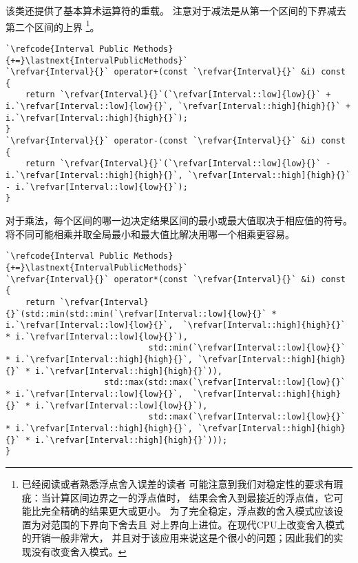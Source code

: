 该类还提供了基本算术运算符的重载。
注意对于减法是从第一个区间的下界减去第二个区间的上界
\footnote{已经阅读\protect{}或者熟悉浮点舍入误差的读者
    可能注意到我们对稳定性的要求有瑕疵：当计算区间边界之一的浮点值时，
    结果会舍入到最接近的浮点值，它可能比完全精确的结果更大或更小。
    为了完全稳定，浮点数的舍入模式应该设置为对范围的下界向下舍去且
    对上界向上进位。在现代CPU上改变舍入模式的开销一般非常大，
    并且对于该应用来说这是个很小的问题；因此我们的实现没有改变舍入模式。}。
\begin{lstlisting}
`\refcode{Interval Public Methods}{+=}\lastnext{IntervalPublicMethods}`
`\refvar{Interval}{}` operator+(const `\refvar{Interval}{}` &i) const {
    return `\refvar{Interval}{}`(`\refvar[Interval::low]{low}{}` + i.`\refvar[Interval::low]{low}{}`, `\refvar[Interval::high]{high}{}` + i.`\refvar[Interval::high]{high}{}`);
}
`\refvar{Interval}{}` operator-(const `\refvar{Interval}{}` &i) const {
    return `\refvar{Interval}{}`(`\refvar[Interval::low]{low}{}` - i.`\refvar[Interval::high]{high}{}`, `\refvar[Interval::high]{high}{}` - i.`\refvar[Interval::low]{low}{}`);
}
\end{lstlisting}

对于乘法，每个区间的哪一边决定结果区间的最小或最大值取决于相应值的符号。
将不同可能相乘并取全局最小和最大值比解决用哪一个相乘更容易。
\begin{lstlisting}
`\refcode{Interval Public Methods}{+=}\lastnext{IntervalPublicMethods}`
`\refvar{Interval}{}` operator*(const `\refvar{Interval}{}` &i) const {
    return `\refvar{Interval}{}`(std::min(std::min(`\refvar[Interval::low]{low}{}` * i.`\refvar[Interval::low]{low}{}`,  `\refvar[Interval::high]{high}{}` * i.`\refvar[Interval::low]{low}{}`),
                             std::min(`\refvar[Interval::low]{low}{}` * i.`\refvar[Interval::high]{high}{}`, `\refvar[Interval::high]{high}{}` * i.`\refvar[Interval::high]{high}{}`)),
                    std::max(std::max(`\refvar[Interval::low]{low}{}` * i.`\refvar[Interval::low]{low}{}`,  `\refvar[Interval::high]{high}{}` * i.`\refvar[Interval::low]{low}{}`),
                             std::max(`\refvar[Interval::low]{low}{}` * i.`\refvar[Interval::high]{high}{}`, `\refvar[Interval::high]{high}{}` * i.`\refvar[Interval::high]{high}{}`)));
}
\end{lstlisting}

